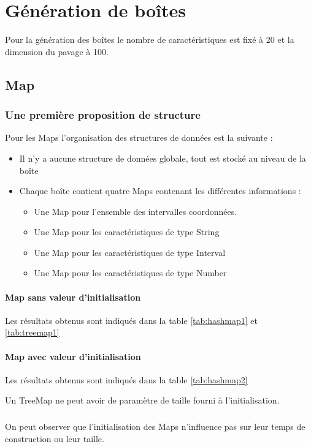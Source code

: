\chapter{Génération de boîtes}
Pour la génération des boîtes le nombre de caractéristiques est fixé à 20 et la dimension du pavage à 100.

\section{Map}

\subsection{Une première proposition de structure}
Pour les Maps l'organisation des structures de données est la suivante :
\begin{itemize}
\item Il n'y a aucune structure de données globale, tout est stocké au niveau de la boîte
 \item Chaque boîte contient quatre Maps contenant les différentes informations :
\begin{itemize}
 \item Une Map pour l'ensemble des intervalles coordonnées.
\item Une Map pour les caractéristiques de type String
\item Une Map pour les caractéristiques de type Interval
\item Une Map pour les caractéristiques de type Number
\end{itemize}
\end{itemize}

\subsubsection{Map sans valeur d'initialisation}
Les résultats obtenus sont indiqués dans la table \ref{tab:hashmap1} et \ref{tab:treemap1}


\subsubsection{Map avec valeur d'initialisation}
Les résultats obtenus sont indiqués dans la table \ref{tab:hashmap2}


Un TreeMap ne peut avoir de paramètre de taille fourni à l'initialisation.

\paragraph{} On peut observer que l'initialisation des Maps n'influence pas sur leur temps de construction ou leur taille.

